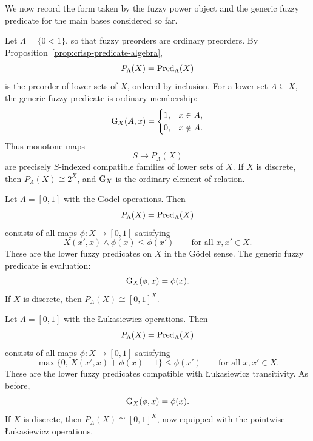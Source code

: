 We now record the form taken by the fuzzy power object and the generic fuzzy predicate for the main bases considered so far.

\begin{example}
\label{ex:crisp-fuzzy-power-object}
    Let \(\Lambda=\{0<1\}\), so that fuzzy preorders are ordinary preorders. By Proposition~\ref{prop:crisp-predicate-algebra},
    \[
        P_\Lambda(X)=\mathrm{Pred}_\Lambda(X)
    \]
    is the preorder of lower sets of \(X\), ordered by inclusion. For a lower set \(A\subseteq X\), the generic fuzzy predicate is ordinary membership:
    \[
        \operatorname{G}_X(A,x)=
        \begin{cases}
            1,&x\in A,\\
            0,&x\notin A.
        \end{cases}
    \]
    Thus monotone maps
    \[
        S\to P_\Lambda(X)
    \]
    are precisely \(S\)-indexed compatible families of lower sets of \(X\). If \(X\) is discrete, then \(P_\Lambda(X)\cong 2^X\), and \(\operatorname{G}_X\) is the ordinary element-of relation.
\end{example}

\begin{example}
\label{ex:godel-fuzzy-power-object}
    Let \(\Lambda=[0,1]\) with the G\"odel operations. Then
    \[
        P_\Lambda(X)=\mathrm{Pred}_\Lambda(X)
    \]
    consists of all maps \(\phi:X\to[0,1]\) satisfying
    \[
        X(x',x)\wedge \phi(x)\leq \phi(x')
        \qquad
        \text{for all }x,x'\in X.
    \]
    These are the lower fuzzy predicates on \(X\) in the G\"odel sense. The generic fuzzy predicate is evaluation:
    \[
        \operatorname{G}_X(\phi,x)=\phi(x).
    \]
    If \(X\) is discrete, then \(P_\Lambda(X)\cong [0,1]^X\).
\end{example}

\begin{example}
\label{ex:lukasiewicz-fuzzy-power-object}
    Let \(\Lambda=[0,1]\) with the {\L}ukasiewicz operations. Then
    \[
        P_\Lambda(X)=\mathrm{Pred}_\Lambda(X)
    \]
    consists of all maps \(\phi:X\to[0,1]\) satisfying
    \[
        \max\{0,\,X(x',x)+\phi(x)-1\}\leq \phi(x')
        \qquad
        \text{for all }x,x'\in X.
    \]
    These are the lower fuzzy predicates compatible with {\L}ukasiewicz transitivity. As before,
    \[
        \operatorname{G}_X(\phi,x)=\phi(x).
    \]
    If \(X\) is discrete, then \(P_\Lambda(X)\cong [0,1]^X\), now equipped with the pointwise {\L}ukasiewicz operations.
\end{example}

